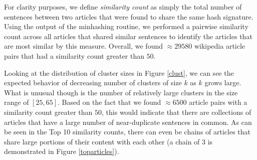 \documentclass{acm_proc_article-sp}
\begin{document}
 For clarity purposes, we define \emph{similarity count} as simply the total number of sentences between two articles that were found to share the same hash signature. Using the output of the minhashing routine, we performed a pairwise similarity count across all articles that shared similar sentences to identify the articles that are most similar by this measure. Overall, we found $\approx 29580$ wikipedia article pairs that had a similarity count greater than $50$.

Looking at the distribution of cluster sizes in Figure \ref{clust}, we can see the expected behavior of decreasing number of clusters of size $k$ as $k$ grows large. What is unusual though is the number of relatively large clusters in the size range of $[25, 65]$. Based on the fact that we found $\approx 6500$ article pairs with a similarity count greater than $50$, this would indicate that there are collections of articles that have a large number of near-duplicate sentences in common. As can be seen in the Top 10 similarity counts, there can even be chains of articles that share large portions of their content with each other (a chain of 3 is demonstrated in Figure \ref{toparticles}).
\end{document}
